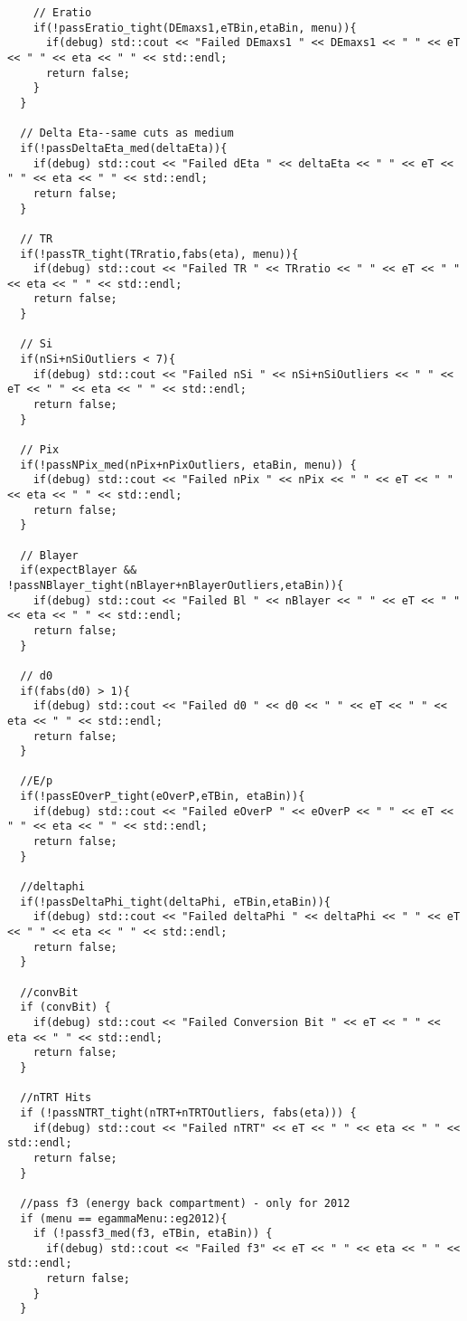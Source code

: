 \begin{lstlisting}
    // Eratio
    if(!passEratio_tight(DEmaxs1,eTBin,etaBin, menu)){
      if(debug) std::cout << "Failed DEmaxs1 " << DEmaxs1 << " " << eT << " " << eta << " " << std::endl;
      return false;
    }
  }
  
  // Delta Eta--same cuts as medium
  if(!passDeltaEta_med(deltaEta)){
    if(debug) std::cout << "Failed dEta " << deltaEta << " " << eT << " " << eta << " " << std::endl;
    return false;
  }

  // TR
  if(!passTR_tight(TRratio,fabs(eta), menu)){
    if(debug) std::cout << "Failed TR " << TRratio << " " << eT << " " << eta << " " << std::endl;
    return false;
  }

  // Si
  if(nSi+nSiOutliers < 7){
    if(debug) std::cout << "Failed nSi " << nSi+nSiOutliers << " " << eT << " " << eta << " " << std::endl;
    return false;
  }

  // Pix
  if(!passNPix_med(nPix+nPixOutliers, etaBin, menu)) {
    if(debug) std::cout << "Failed nPix " << nPix << " " << eT << " " << eta << " " << std::endl;
    return false;
  }

  // Blayer
  if(expectBlayer && !passNBlayer_tight(nBlayer+nBlayerOutliers,etaBin)){
    if(debug) std::cout << "Failed Bl " << nBlayer << " " << eT << " " << eta << " " << std::endl;
    return false;
  }

  // d0
  if(fabs(d0) > 1){
    if(debug) std::cout << "Failed d0 " << d0 << " " << eT << " " << eta << " " << std::endl;
    return false;
  }

  //E/p
  if(!passEOverP_tight(eOverP,eTBin, etaBin)){
    if(debug) std::cout << "Failed eOverP " << eOverP << " " << eT << " " << eta << " " << std::endl;
    return false;
  }

  //deltaphi
  if(!passDeltaPhi_tight(deltaPhi, eTBin,etaBin)){
    if(debug) std::cout << "Failed deltaPhi " << deltaPhi << " " << eT << " " << eta << " " << std::endl;
    return false;
  }
  
  //convBit
  if (convBit) {
    if(debug) std::cout << "Failed Conversion Bit " << eT << " " << eta << " " << std::endl;
    return false; 
  }

  //nTRT Hits
  if (!passNTRT_tight(nTRT+nTRTOutliers, fabs(eta))) { 
    if(debug) std::cout << "Failed nTRT" << eT << " " << eta << " " << std::endl;
    return false; 
  }

  //pass f3 (energy back compartment) - only for 2012
  if (menu == egammaMenu::eg2012){
    if (!passf3_med(f3, eTBin, etaBin)) { 
      if(debug) std::cout << "Failed f3" << eT << " " << eta << " " << std::endl;
      return false; 
    }
  }


\end{lstlisting}
